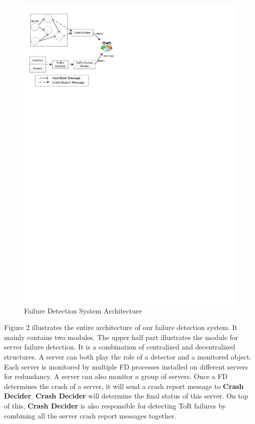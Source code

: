 \documentclass{sig-alternate-05-2015}
\begin{document}
\begin{figure}[t]
\centering
\includegraphics{system}
\caption{Failure Detection System Architecture}
\end{figure}

Figure 2 illustrates the entire architecture of our failure detection system. It mainly contains two modules. The upper half part illustrates the module for server failure detection. It is a combination of centralized and decentralized structures. A server can both play the role of a detector and a monitored object. Each server is monitored by multiple FD processes installed on different servers for redundancy. A server can also monitor a group of servers. Once a FD determines the crash of a server, it will send a crash report message to \textbf{Crash Decider}. \textbf{Crash Decider} will determine the final status of this server. On top of this, \textbf{Crash Decider} is also responsible for detecting ToR failures by combining all the server crash report messages together.
\end{document}
